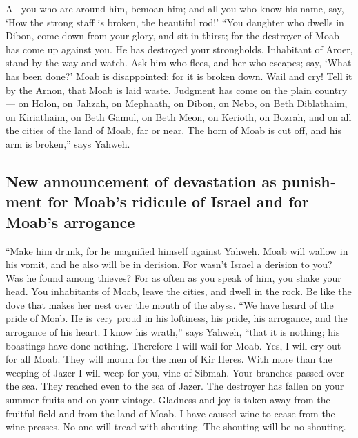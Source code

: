 \begin{paracol}{2}
\begin{otherlanguage}{english}
 All you who are around him, bemoan him; and all you who
know his name, say, `How the strong staff is broken, the beautiful rod!'
 ``You daughter who dwells in Dibon, come down from your
glory, and sit in thirst; for the destroyer of Moab has come up against
you. He has destroyed your strongholds.  Inhabitant of
Aroer, stand by the way and watch. Ask him who flees, and her who
escapes; say, `What has been done?'  Moab is
disappointed; for it is broken down. Wail and cry! Tell it by the Arnon,
that Moab is laid waste.  Judgment has come on the plain
country--- on Holon, on Jahzah, on Mephaath,  on Dibon,
on Nebo, on Beth Diblathaim,  on Kiriathaim, on Beth
Gamul, on Beth Meon,  on Kerioth, on Bozrah, and on all
the cities of the land of Moab, far or near.  The horn of
Moab is cut off, and his arm is broken,'' says Yahweh.

\hypertarget{new-announcement-of-devastation-as-punishment-for-moabs-ridicule-of-israel-and-for-moabs-arrogance}{%
\subsection{New announcement of devastation as punishment for Moab's
ridicule of Israel and for Moab's
arrogance}\label{new-announcement-of-devastation-as-punishment-for-moabs-ridicule-of-israel-and-for-moabs-arrogance}}

 ``Make him drunk, for he magnified himself against
Yahweh. Moab will wallow in his vomit, and he also will be in derision.
 For wasn't Israel a derision to you? Was he found among
thieves? For as often as you speak of him, you shake your head.
 You inhabitants of Moab, leave the cities, and dwell in
the rock. Be like the dove that makes her nest over the mouth of the
abyss.  ``We have heard of the pride of Moab. He is very
proud in his loftiness, his pride, his arrogance, and the arrogance of
his heart.  I know his wrath,'' says Yahweh, ``that it is
nothing; his boastings have done nothing.  Therefore I
will wail for Moab. Yes, I will cry out for all Moab. They will mourn
for the men of Kir Heres.  With more than the weeping of
Jazer I will weep for you, vine of Sibmah. Your branches passed over the
sea. They reached even to the sea of Jazer. The destroyer has fallen on
your summer fruits and on your vintage.  Gladness and joy
is taken away from the fruitful field and from the land of Moab. I have
caused wine to cease from the wine presses. No one will tread with
shouting. The shouting will be no shouting.


\end{otherlanguage}
\end{paracol}
